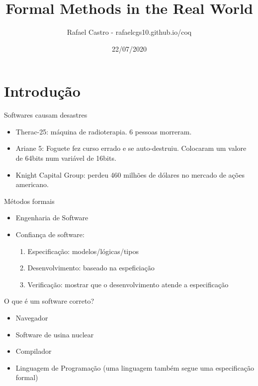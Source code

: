 \documentclass[presentation]{beamer}
\author{Rafael Castro - rafaelcgs10.github.io/coq}
\date{22/07/2020}
\title{Formal Methods in the Real World}
\begin{document}
\maketitle

\section{Introdução}
\label{sec:orgfc9fbc9}

\begin{frame}[label={sec:orgd122416}]{Softwares causam desastres}
\begin{itemize}
\item Therac-25: máquina de radioterapia. 6 pessoas morreram.
\item Ariane 5: Foguete fez curso errado e se auto-destruiu. Colocaram um valore de 64bits num variável de 16bits.
\item Knight Capital Group: perdeu 460 milhões de dólares no mercado de ações americano.
\end{itemize}
\end{frame}

\begin{frame}[label={sec:org6a0a6b4}]{Métodos formais}
\begin{itemize}
\item Engenharia de Software
\item Confiança de software:
\begin{enumerate}
\item Especificação: modelos/lógicas/tipos
\item Desenvolvimento: baseado na espeficiação
\item Verificação: mostrar que o desenvolvimento atende a especificação
\end{enumerate}
\end{itemize}
\end{frame}

\begin{frame}[label={sec:org67cc214}]{O que é um software correto?}
\begin{itemize}
\item Navegador
\item Software de usina nuclear
\item Compilador
\item Linguagem de Programação (uma linguagem também segue uma especificação formal)
\end{itemize}
\end{frame}
\end{document}
